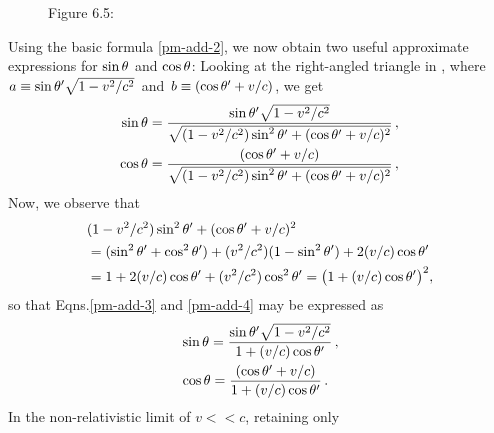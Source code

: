 \begin{figure}[H]
\begin{center}
\end{center}
\caption*{Figure 6.5:}\label{fig6.5}
\end{figure}
Using the basic formula \eqref{pm-add-2}, we now obtain 
 two 
useful approximate expressions for  $\sin{\theta}$ and 
$\cos{\theta}$: Looking at the right-angled triangle in 
, where  
$a\equiv\sin{\theta}'\sqrt{1-v^2/c^2}$ 
and $b\equiv(\cos{\theta}'+v/c)$, we get
\begin{align}\label{pm-add-3}
\sin{\theta}&=\frac{\sin{\theta}'\sqrt{1-v^2/c^2}}
{\sqrt{(1-v^2/c^2)\sin^2{\theta}'+(\cos{\theta}'+v/c)^2}}\,,\\
\label{pm-add-4}
\cos{\theta}&=\frac{(\cos{\theta}'+v/c)}
{\sqrt{(1-v^2/c^2)\sin^2{\theta}'+(\cos{\theta}'+v/c)^2}}\,,
\end{align}
Now, we observe that
\begin{align*}
&(1-v^2/c^2)\sin^2{\theta}'+(\cos{\theta}'+v/c)^2 \\
&=(\sin^2{\theta}'+\cos^2{\theta}')+(v^2/c^2)(1-\sin^2{\theta}')
+2(v/c)\cos{\theta}'\notag\\
&=1+2(v/c)\cos{\theta}'+(v^2/c^2)\cos^2{\theta}'= 
\big(1 + (v/c)\cos{\theta}'\big)^2,
\end{align*}
so that Eqns.\eqref{pm-add-3} and \eqref{pm-add-4} may 
be 
expressed as
\begin{align}\label{pm-add-5}
&\sin{\theta}=\frac{\sin{\theta}'\sqrt{1-v^2/c^2}}
{1+(v/c)\cos{\theta}'}\,,\\ \label{pm-add-6}
&\cos{\theta}=\frac{(\cos{\theta}'+v/c)}{1+(v/c)\cos{\theta}'}\,.
\end{align}
In the non-relativistic limit of $v<<c$, retaining only 
 
